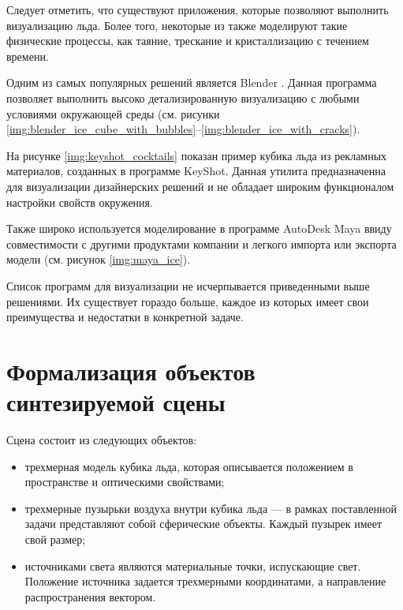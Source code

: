 Следует отметить, что существуют приложения, которые позволяют выполнить визуализацию льда. Более того, некоторые из также моделируют такие физические процессы, как таяние, трескание и кристаллизацию с течением времени.

Одним из самых популярных решений является Blender \cite{blenderice}. Данная программа позволяет выполнить высоко детализированную визуализацию с любыми условиями окружающей среды (см. рисунки \ref{img:blender_ice_cube_with_bubbles}--\ref{img:blender_ice_with_cracks}).


\newpage



На рисунке \ref{img:keyshot_cocktails} показан пример кубика льда из рекламных материалов, созданных в программе KeyShot. Данная утилита предназначенна для визуализации дизайнерских решений и не обладает широким функционалом настройки свойств окружения.


Также широко используется моделирование в программе AutoDesk Maya ввиду совместимости с другими продуктами компании и легкого импорта или экспорта модели (см. рисунок \ref{img:maya_ice}).

Список программ для визуализации не исчерпывается приведенными выше решениями. Их существует гораздо больше, каждое из которых имеет свои преимущества и недостатки в конкретной задаче.


\section{Формализация объектов синтезируемой сцены}

Сцена состоит из следующих объектов:
\begin{itemize}
	\item трехмерная модель кубика льда, которая описывается положением в пространстве и оптическими свойствами;
	\item трехмерные пузырьки воздуха внутри кубика льда --- в рамках поставленной задачи представляют собой сферические объекты. Каждый пузырек имеет свой размер;
	\item источниками света являются материальные точки, испускающие свет. Положение источника задается трехмерными координатами, а направление распространения вектором.
\end{itemize}


